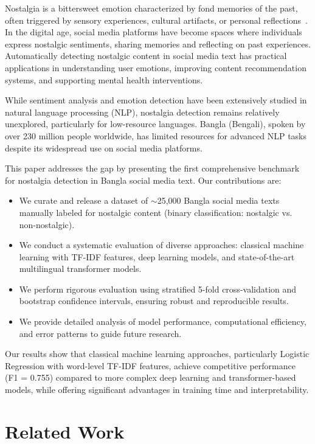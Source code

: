 \documentclass[conference]{IEEEtran}
\begin{document}
Nostalgia is a bittersweet emotion characterized by fond memories of the past, often triggered by sensory experiences, cultural artifacts, or personal reflections~\cite{sedikides2015nostalgia}. In the digital age, social media platforms have become spaces where individuals express nostalgic sentiments, sharing memories and reflecting on past experiences. Automatically detecting nostalgic content in social media text has practical applications in understanding user emotions, improving content recommendation systems, and supporting mental health interventions.

While sentiment analysis and emotion detection have been extensively studied in natural language processing (NLP), nostalgia detection remains relatively unexplored, particularly for low-resource languages. Bangla (Bengali), spoken by over 230 million people worldwide, has limited resources for advanced NLP tasks despite its widespread use on social media platforms.

This paper addresses the gap by presenting the first comprehensive benchmark for nostalgia detection in Bangla social media text. Our contributions are:

\begin{itemize}
\item We curate and release a dataset of $\sim$25,000 Bangla social media texts manually labeled for nostalgic content (binary classification: nostalgic vs. non-nostalgic).
\item We conduct a systematic evaluation of diverse approaches: classical machine learning with TF-IDF features, deep learning models, and state-of-the-art multilingual transformer models.
\item We perform rigorous evaluation using stratified 5-fold cross-validation and bootstrap confidence intervals, ensuring robust and reproducible results.
\item We provide detailed analysis of model performance, computational efficiency, and error patterns to guide future research.
\end{itemize}

Our results show that classical machine learning approaches, particularly Logistic Regression with word-level TF-IDF features, achieve competitive performance (F1 = 0.755) compared to more complex deep learning and transformer-based models, while offering significant advantages in training time and interpretability.

\section{Related Work}
\end{document}
